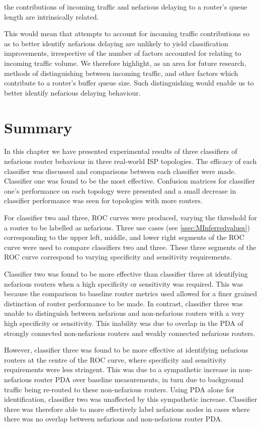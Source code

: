 the contributions of incoming traffic and nefarious delaying to a router's queue length are intrinsically related.\par
This would mean that attempts to account for incoming traffic contributions so as to better identify nefarious delaying are unlikely to yield classification improvements, irrespective of the number of factors accounted for relating to incoming traffic volume. We therefore highlight, as an area for future research, methods of distinguishing between incoming traffic, and other factors which contribute to a router's buffer queue size. Such distinguishing would enable us to better identify nefarious delaying behaviour.\par

\section{Summary}
In this chapter we have presented experimental results of three classifiers of nefarious router behaviour in three real-world ISP topologies. The efficacy of each classifier was discussed and comparisons between each classifier were made. Classifier one was found to be the most effective. Confusion matrices for classifier one's performance on each topology were presented and a small decrease in classifier performance was seen for topologies with more routers.\par
For classifier two and three, ROC curves were produced, varying the threshold for a router to be labelled as nefarious. Three use cases (see \cref{ssec:MInferredvalues}) corresponding to the upper left, middle, and lower right segments of the ROC curve were used to compare classifiers two and three. These three segments of the ROC curve correspond to varying specificity and sensitivity requirements.\par
Classifier two was found to be more effective than classifier three at identifying nefarious routers when a high specificity or sensitivity was required. This was because the comparison to baseline router metrics used allowed for a finer grained distinction of router performance to be made. In contrast, classifier three was unable to distinguish between nefarious and non-nefarious routers with a very high specificity or sensitivity. This inability was due to overlap in the PDA of strongly connected non-nefarious routers and weakly connected nefarious routers.\par
However, classifier three was found to be more effective at identifying nefarious routers at the centre of the ROC curve, where specificity and sensitivity requirements were less stringent. This was due to a sympathetic increase in non-nefarious router PDA over baseline measurements, in turn due to background traffic being re-routed to these non-nefarious routers. Using PDA alone for identification, classifier two was unaffected by this sympathetic increase. Classifier three was therefore able to more effectively label nefarious nodes in cases where there was no overlap between nefarious and non-nefarious router PDA.\par
